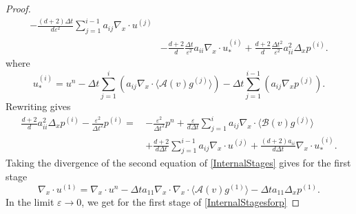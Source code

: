 \documentclass[10pt,a4paper]{amsart}
\begin{document}
\begin{proof}
\begin{equation}
\begin{split}
- \frac{(d+2)\Delta t}{d \varepsilon^2} \sum_{j = 1}^{i-1} a_{ij} \nabla_x \cdot u^{(j)} \\
& - \frac{d+2}{d} \frac{\Delta t}{\varepsilon^2} a_{ii} \nabla_x \cdot u^{(i)}_* 
+ \frac{d+2}{d} \frac{\Delta t^2}{\varepsilon^2} a_{ii}^2 \Delta_x p^{(i)}.
\end{split}
\end{equation}
where
\begin{equation}
u^{(i)}_* = u^n - \Delta t  \sum_{j = 1}^i \left( a_{ij} \nabla_x \cdot \langle \mathcal{A}(v) g^{(j)} \rangle \right) - \Delta t  \sum_{j = 1}^{i-1} \left( a_{ij} \nabla_x p^{(j)} \right).
\end{equation}
Rewriting gives
\begin{equation}
\label{InternalStagesforp}
\begin{split}
\frac{d+2}{d} a_{ii}^2 \Delta_x p^{(i)} - \frac{\varepsilon^2}{\Delta t^2 } p^{(i)} = \, & -\frac{\varepsilon^2}{\Delta t^2 } p^n + \frac{\varepsilon}{d \Delta t } \sum_{j = 1}^i a_{ij} \nabla_x \cdot \langle \mathcal{B}(v) g^{(j)} \rangle \\
& + \frac{d+2}{d \Delta t } \sum_{j = 1}^{i-1} a_{ij} \nabla_x \cdot u^{(j)} + \frac{(d+2)a_{ii}}{d \Delta t } \nabla_x \cdot u^{(i)}_*.
\end{split}
\end{equation}
Taking the divergence of the second equation of \eqref{InternalStages} gives for the first stage
\begin{equation} \label{SecondProofReference}
\nabla_x \cdot u^{(1)} = \nabla_x \cdot u^n - \Delta t  a_{11} \nabla_x \cdot \nabla_x \cdot \langle \mathcal{A}(v) g^{(1)} \rangle
- \Delta t a_{11} \Delta_x p^{(1)}.
\end{equation}
In the limit $\varepsilon \to 0$, we get for the first stage of \eqref{InternalStagesforp}

\end{proof}
\end{document}
